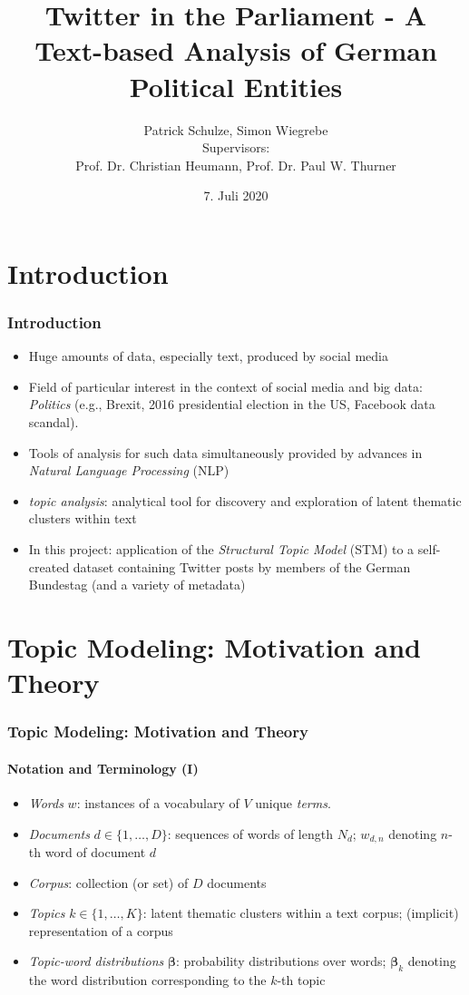\documentclass[xcolor=dvipsnames]{beamer}
\title{Twitter in the Parliament - A Text-based Analysis of German Political Entities}
\date{7. Juli 2020}
\author[author1]{Patrick Schulze, Simon Wiegrebe\\[10mm]{\small Supervisors:\\ Prof. Dr. Christian Heumann, Prof. Dr. Paul W. Thurner}}
\begin{document}
\begin{frame}
\titlepage
\end{frame}


\section{Introduction}
\begin{frame}
\frametitle{Introduction}
\begin{itemize}
\item Huge amounts of data, especially text, produced by social media
\item Field of particular interest in the context of social media and big data: \textit{Politics} (e.g., Brexit, 2016 presidential election in the US, Facebook data scandal).
\item Tools of analysis for such data simultaneously provided by advances in \textit{Natural Language Processing} (NLP)
\item \textit{topic analysis}: analytical tool for discovery and exploration of latent thematic clusters within text
\item In this project: application of the \textit{Structural Topic Model} (STM) \cite{roberts2016model} to a self-created dataset containing Twitter posts by members of the German Bundestag (and a variety of metadata) 
\end{itemize}
\end{frame}

\section{Topic Modeling: Motivation and Theory}
\begin{frame}
\frametitle{Topic Modeling: Motivation and Theory}
\framesubtitle{Notation and Terminology (I)}
\begin{itemize}
\item \textit{Words} $w$: instances of a vocabulary of $V$ unique \textit{terms}.
\item \textit{Documents} $d \in \{1,\dots,D\}$: sequences of words of length $N_{d}$; $w_{d,n}$ denoting $n$-th word of document $d$
\item \textit{Corpus}: collection (or set) of $D$ documents
\item \textit{Topics} $k \in \{1,\dots,K\}$: latent thematic clusters within a text corpus; (implicit) representation of a corpus
\item \textit{Topic-word distributions} $\boldsymbol{\beta}$: probability distributions over words; $\boldsymbol{\beta}_k$ denoting the word distribution corresponding to the $k$-th topic
\end{itemize}
\end{frame}
\end{document}
